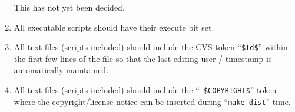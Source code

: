 \begin{enumerate}
\begin{discuss}
    This has not yet been decided.
  \end{discuss}
  
\item All executable scripts should have their execute bit set.
  
\item All text files (scripts included) should include the CVS token
  ``{\tt \$Id\$}'' within the first few lines of the file so that the
  last editing user / timestamp is automatically maintained.
  
\item All text files (scripts included) should include the ``{\tt
    \$COPYRIGHT\$}'' token where the copyright/license notice can be
  inserted during ``{\tt make dist}'' time.

\end{enumerate}

